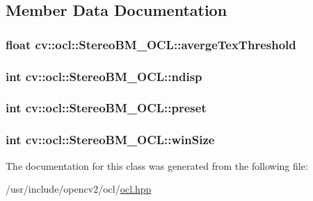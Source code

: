 \subsection{Member Data Documentation}
\hypertarget{classcv_1_1ocl_1_1StereoBM__OCL_ae20e72d4f59d6be0519ccd4ce3930fd9}{
\subsubsection[{averge\-Tex\-Threshold}]{\setlength{\rightskip}{0pt plus 5cm}float cv\-::ocl\-::\-Stereo\-B\-M\-\_\-\-O\-C\-L\-::averge\-Tex\-Threshold}}\label{classcv_1_1ocl_1_1StereoBM__OCL_ae20e72d4f59d6be0519ccd4ce3930fd9}
\hypertarget{classcv_1_1ocl_1_1StereoBM__OCL_a29da1385aca0fdac39969f7dee0d66b1}{
\subsubsection[{ndisp}]{\setlength{\rightskip}{0pt plus 5cm}int cv\-::ocl\-::\-Stereo\-B\-M\-\_\-\-O\-C\-L\-::ndisp}}\label{classcv_1_1ocl_1_1StereoBM__OCL_a29da1385aca0fdac39969f7dee0d66b1}
\hypertarget{classcv_1_1ocl_1_1StereoBM__OCL_acef365d858035ce0a04717c7d2702a53}{
\subsubsection[{preset}]{\setlength{\rightskip}{0pt plus 5cm}int cv\-::ocl\-::\-Stereo\-B\-M\-\_\-\-O\-C\-L\-::preset}}\label{classcv_1_1ocl_1_1StereoBM__OCL_acef365d858035ce0a04717c7d2702a53}
\hypertarget{classcv_1_1ocl_1_1StereoBM__OCL_a3041e91028d459e913db11557cff9800}{
\subsubsection[{win\-Size}]{\setlength{\rightskip}{0pt plus 5cm}int cv\-::ocl\-::\-Stereo\-B\-M\-\_\-\-O\-C\-L\-::win\-Size}}\label{classcv_1_1ocl_1_1StereoBM__OCL_a3041e91028d459e913db11557cff9800}


The documentation for this class was generated from the following file\-:\begin{DoxyCompactItemize}
\item 
/usr/include/opencv2/ocl/\hyperlink{ocl_2ocl_8hpp}{ocl.\-hpp}\end{DoxyCompactItemize}
